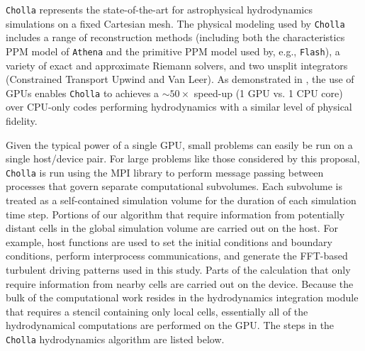 \documentclass[11pt,letterpaper,english]{article}
\begin{document}
{\tt Cholla} represents the state-of-the-art for astrophysical hydrodynamics simulations on a fixed Cartesian mesh. The physical modeling used by {\tt Cholla} includes a range of reconstruction methods (including both the characteristics PPM model of {\tt Athena} and the primitive PPM model used by, e.g., {\tt Flash}), a variety of exact and approximate Riemann solvers, and two unsplit integrators (Constrained Transport Upwind and Van Leer). As demonstrated in \cite{Schneider15}, the use of GPUs enables {\tt Cholla} to achieves a $\sim50\times$ speed-up (1 GPU vs. 1 CPU core) over CPU-only codes performing hydrodynamics with a similar level of physical fidelity.

Given the typical power of a single GPU, small problems can easily be run on a single host/device pair. For large problems like those considered by this proposal, {\tt Cholla} is run using the MPI library to perform message passing between processes that govern separate computational subvolumes. Each subvolume is treated as a self-contained simulation volume for the duration of each simulation time step. Portions of our algorithm that require information from potentially distant cells in the global simulation volume are carried out on the host. For example, host functions are used to set the initial conditions and boundary conditions, perform interprocess communications, and generate the FFT-based turbulent driving patterns used in this study. Parts of the calculation that only require information from nearby cells are carried out on the device. Because the bulk of the computational work resides in the hydrodynamics integration module that requires a stencil containing only local cells, essentially all of the hydrodynamical computations are performed on the GPU.
The steps in the {\tt Cholla} hydrodynamics algorithm are listed below.
\vspace{-.1in}
\end{document}
